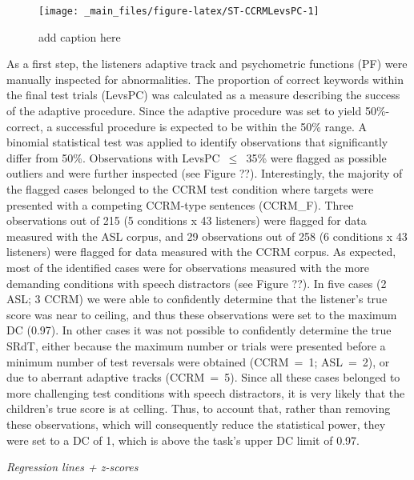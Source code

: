 \documentclass[a4paper, twoside]{templates/ociamthesis}
\begin{document}
\begin{figure}
\texttt{[image: \_main\_files/figure-latex/ST-CCRMLevsPC-1]} \caption{add caption here}\label{fig:ST-CCRMLevsPC}
\end{figure}

As a first step, the listeners adaptive track and psychometric functions (PF) were manually inspected for abnormalities. The proportion of correct keywords within the final test trials (LevsPC) was calculated as a measure describing the success of the adaptive procedure. Since the adaptive procedure was set to yield 50\%-correct, a successful procedure is expected to be within the 50\% range. A binomial statistical test was applied to identify observations that significantly differ from 50\%. Observations with LevsPC~\(\leq\)~35\% were flagged as possible outliers and were further inspected (see Figure ??). Interestingly, the majority of the flagged cases belonged to the CCRM test condition where targets were presented with a competing CCRM-type sentences (CCRM\_F). Three observations out of 215 (5 conditions x 43 listeners) were flagged for data measured with the ASL corpus, and 29 observations out of 258 (6 conditions x 43 listeners) were flagged for data measured with the CCRM corpus. As expected, most of the identified cases were for observations measured with the more demanding conditions with speech distractors (see Figure ??). In five cases (2 ASL; 3 CCRM) we were able to confidently determine that the listener's true score was near to ceiling, and thus these observations were set to the maximum DC (0.97). In other cases it was not possible to confidently determine the true SRdT, either because the maximum number or trials were presented before a minimum number of test reversals were obtained (CCRM~=~1; ASL~=~2), or due to aberrant adaptive tracks (CCRM~=~5). Since all these cases belonged to more challenging test conditions with speech distractors, it is very likely that the children's true score is at celling. Thus, to account that, rather than removing these observations, which will consequently reduce the statistical power, they were set to a DC of 1, which is above the task's upper DC limit of 0.97.

\colorbox[HTML]{CCCCFF}{\emph{Regression lines + z-scores}}
\end{document}
